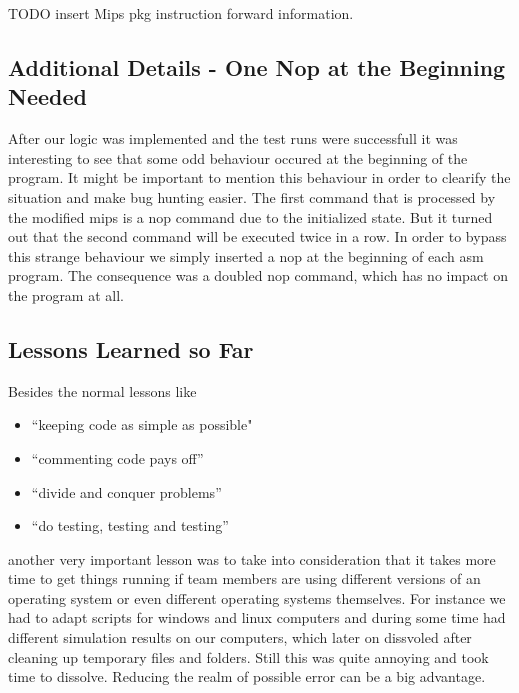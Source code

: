 TODO insert Mips pkg instruction forward information.




\subsection{Additional Details - One Nop at the Beginning Needed}
After our logic was implemented and the test runs were successfull it was interesting to see that some odd behaviour occured at the beginning of the program. It might be important to mention this behaviour in order to clearify   the situation and make bug hunting easier. The first command that is processed by the modified mips is a nop command due to the initialized state.  But it turned out that the second command will be executed twice in a row. In order to bypass this strange behaviour we simply inserted a nop at the beginning of each asm program. The consequence was a doubled nop command, which has no impact on the program at all.

\subsection{Lessons Learned so Far}
Besides the normal lessons like 

\begin{itemize}
\item ``keeping code as simple as possible"
\item ``commenting code pays off''
\item ``divide and conquer problems''
\item ``do testing, testing and testing''
\end{itemize}

another very important lesson was to take into consideration that it takes more time to get things running if team members are using different versions of an operating system or even different operating systems themselves. For instance we had to adapt scripts for windows and linux computers and during some time had different simulation results on our computers, which later on dissvoled after cleaning up temporary files and folders. Still this was quite annoying and took time to dissolve. Reducing the realm of possible error can be a big advantage.


